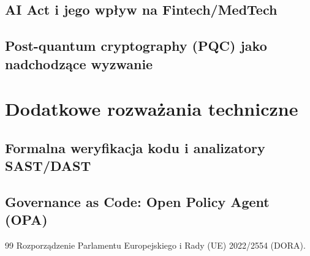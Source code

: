 \documentclass[12pt,a4paper,oneside]{book}
\begin{document}
\section{AI Act i jego wpływ na Fintech/MedTech}
\section{Post-quantum cryptography (PQC) jako nadchodzące wyzwanie}

\appendix
\chapter{Dodatkowe rozważania techniczne}
\section{Formalna weryfikacja kodu i analizatory SAST/DAST}
\section{Governance as Code: Open Policy Agent (OPA)}

\begin{thebibliography}{99}
 Rozporządzenie Parlamentu Europejskiego i Rady (UE) 2022/2554 (DORA).
\end{thebibliography}
\end{document}
